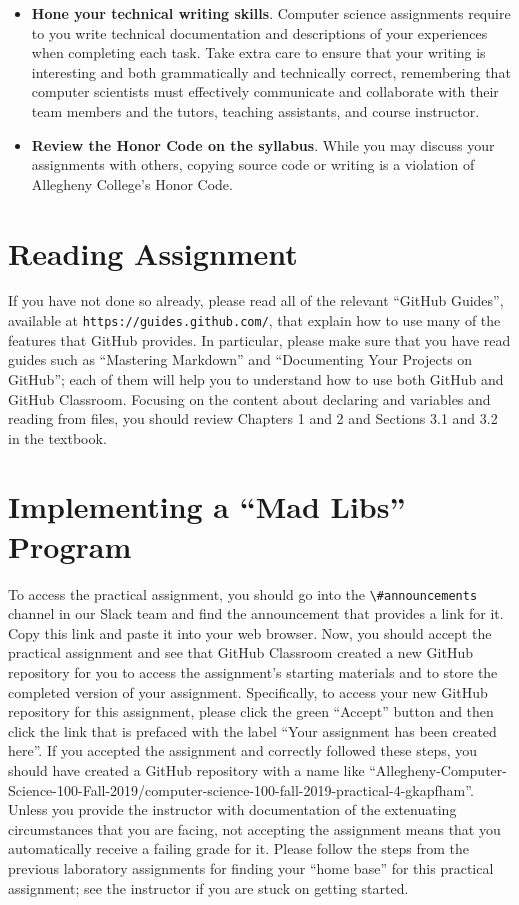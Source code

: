 \documentclass[11pt]{article}
\newcommand{\url}[1]{\lstinline{#1}}
\newcommand{\channel}[1]{\lstinline{#1}}
\begin{document}
\begin{itemize}
\item {\bf Hone your technical writing skills}. Computer science assignments
  require to you write technical documentation and descriptions of your
  experiences when completing each task. Take extra care to ensure that your
  writing is interesting and both grammatically and technically correct,
  remembering that computer scientists must effectively communicate and
  collaborate with their team members and the tutors, teaching assistants, and
  course instructor.

\item {\bf Review the Honor Code on the syllabus}. While you may discuss your
  assignments with others, copying source code or writing is a violation of
  Allegheny College's Honor Code.

\end{itemize}

\section*{Reading Assignment}

If you have not done so already, please read all of the relevant ``GitHub
Guides'', available at \url{https://guides.github.com/}, that explain how to use
many of the features that GitHub provides. In particular, please make sure that
you have read guides such as ``Mastering Markdown'' and ``Documenting Your
Projects on GitHub''; each of them will help you to understand how to use both
GitHub and GitHub Classroom. Focusing on the content about declaring and
variables and reading from files, you should review Chapters 1 and 2 and
Sections 3.1 and 3.2 in the textbook.

\section*{Implementing a ``Mad Libs'' Program}

To access the practical assignment, you should go into the
\channel{\#announcements} channel in our Slack team and find the announcement
that provides a link for it. Copy this link and paste it into your web browser.
Now, you should accept the practical assignment and see that GitHub Classroom
created a new GitHub repository for you to access the assignment's starting
materials and to store the completed version of your assignment. Specifically,
to access your new GitHub repository for this assignment, please click the green
``Accept'' button and then click the link that is prefaced with the label ``Your
assignment has been created here''. If you accepted the assignment and correctly
followed these steps, you should have created a GitHub repository with a name
like
``Allegheny-Computer-Science-100-Fall-2019/computer-science-100-fall-2019-practical-4-gkapfham''.
Unless you provide the instructor with documentation of the extenuating
circumstances that you are facing, not accepting the assignment means that you
automatically receive a failing grade for it. Please follow the steps from the
previous laboratory assignments for finding your ``home base'' for this
practical assignment; see the instructor if you are stuck on getting started.
\end{document}

